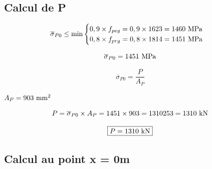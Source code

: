 \documentclass[12pt,a4paper]{article}
\newcommand{\sigmabar}[1]{\overline{\sigma}_{#1}}
\begin{document}
	
	\subsection{Calcul de \textbf{P}}
	
	\[ \sigmabar{P0} \leq \min\begin{cases}
		0,9 \times f_{peg} = 0,9 \times 1623 = 1460\mpa \\
		0,8 \times f_{prg} = 0,8 \times 1814 = 1451\mpa
	\end{cases} \]
	
	\[ \sigmabar{P0} = 1451\mpa \]
	
	\[ \sigmabar{P0} = \dfrac{P}{A_{P}} \]
	
	$A_{P} = 903\mms$
	
	\[ P = \sigmabar{P0} \times A_{P} = 1451 \times 903 = 1310253 = 1310\kn \]
	
	\[ \fbox{$P = 1310\kn$} \]
	
	\vspace{4\baselineskip}
	
	\subsection{Calcul au point x = 0m}
	
	\vspace{\baselineskip}
	
\end{document}
